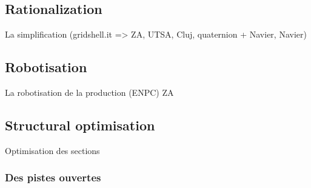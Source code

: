 \subsection{Rationalization}
La simplification (gridshell.it => ZA, UTSA, Cluj, quaternion + Navier, Navier)

\subsection{Robotisation}
La robotisation de la production (ENPC)
\cite{Menges2016}
ZA

\subsection{Structural optimisation}
Optimisation des sections
\cite{DAmico2015}










\clearpage

\subsubsection{Des pistes ouvertes}











